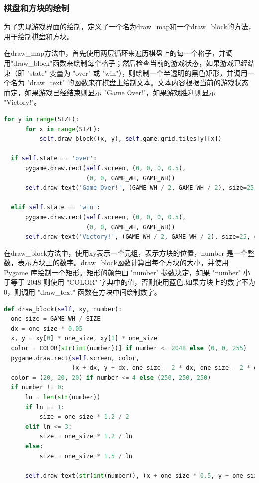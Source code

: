 \documentclass[UTF8,AutoFakeBold,AutoFakeSlant,zihao=-4]{ctexart}
\begin{document}
\subsubsection{棋盘和方块的绘制}
为了实现游戏界面的绘制，定义了一个名为draw\_map和一个draw\_block的方法，用于绘制棋盘和方块。

在draw\_map方法中，首先使用两层循环来遍历棋盘上的每一个格子，并调用"draw\_block"函数来绘制每个格子；然后检查当前的游戏状态，如果游戏已经结束（即 "state" 变量为 "over" 或 "win"），则绘制一个半透明的黑色矩形，并调用一个名为 "draw\_text" 的函数来在棋盘上绘制文本。文本内容根据当前的游戏状态而定，如果游戏已经结束则显示 "Game Over!"，如果游戏胜利则显示 "Victory!"。

\begin{lstlisting}[language=Python]
  for y in range(SIZE):
      for x in range(SIZE):
          self.draw_block((x, y), self.game.grid.tiles[y][x])

  if self.state == 'over':
      pygame.draw.rect(self.screen, (0, 0, 0, 0.5),
                       (0, 0, GAME_WH, GAME_WH))
      self.draw_text('Game Over!', (GAME_WH / 2, GAME_WH / 2), size=25, center='center')

  elif self.state == 'win':
      pygame.draw.rect(self.screen, (0, 0, 0, 0.5),
                       (0, 0, GAME_WH, GAME_WH))
      self.draw_text('Victory!', (GAME_WH / 2, GAME_WH / 2), size=25, center='center')
  \end{lstlisting}

  在draw\_block方法中，使用xy表示一个元组，表示方块的位置，number 是一个整数，表示方块上的数字。draw\_block函数计算出每个方块的大小，并使用 Pygame 库绘制一个矩形。矩形的颜色由 "number" 参数决定，如果 "number" 小于等于 2048 则使用 "COLOR" 字典中的值，否则使用蓝色.如果方块上的数字不为 0，则调用 "draw\_text" 函数在方块中间绘制数字。
\begin{lstlisting}[language=Python]
  def draw_block(self, xy, number):
  one_size = GAME_WH / SIZE
  dx = one_size * 0.05
  x, y = xy[0] * one_size, xy[1] * one_size
  color = COLOR[str(int(number))] if number <= 2048 else (0, 0, 255)
  pygame.draw.rect(self.screen, color,
                   (x + dx, y + dx, one_size - 2 * dx, one_size - 2 * dx))
  color = (20, 20, 20) if number <= 4 else (250, 250, 250)
  if number != 0:
      ln = len(str(number))
      if ln == 1:
          size = one_size * 1.2 / 2
      elif ln <= 3:
          size = one_size * 1.2 / ln
      else:
          size = one_size * 1.5 / ln

      self.draw_text(str(int(number)), (x + one_size * 0.5, y + one_size * 0.5 - size / 2), color, size, 'center')
\end{lstlisting}
\end{document}
